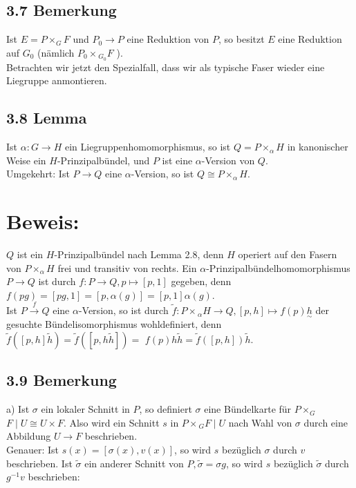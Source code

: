 \documentclass[10pt, letterpaper]{article}
\begin{document}
\subsection*{3.7 Bemerkung}
Ist $E=P \times_{G} F$ und $P_{0} \rightarrow P$ eine Reduktion von $P$, so besitzt $E$ eine Reduktion auf $G_{0}$ (nämlich $P_{0} \times{ }_{G_{0}} F$ ).\\
Betrachten wir jetzt den Spezialfall, dass wir als typische Faser wieder eine Liegruppe anmontieren.

\subsection*{3.8 Lemma}
Ist $\alpha: G \rightarrow H$ ein Liegruppenhomomorphismus, so ist $Q=P \times_{\alpha} H$ in kanonischer Weise ein $H$-Prinzipalbündel, und $P$ ist eine $\alpha$-Version von $Q$.\\
Umgekehrt: Ist $P \rightarrow Q$ eine $\alpha$-Version, so ist $Q \cong P \times_{\alpha} H$.

\section*{Beweis:}
$Q$ ist ein $H$-Prinzipalbündel nach Lemma 2.8, denn $H$ operiert auf den Fasern von $P \times_{\alpha} H$ frei und transitiv von rechts. Ein $\alpha$-Prinzipalbündelhomomorphismus $P \rightarrow Q$ ist durch $f: P \rightarrow Q, p \mapsto[p, 1]$ gegeben, denn $f(p g)=[p g, 1]=[p, \alpha(g)]=[p, 1] \alpha(g)$.\\
Ist $P \xrightarrow{f} Q$ eine $\alpha$-Version, so ist durch $\tilde{f}: P \times{ }_{\alpha} H \rightarrow Q,[p, h] \mapsto f(p) \underset{\sim}{h}$ der gesuchte Bündelisomorphismus wohldefiniert, denn $\tilde{f}([p, h] \tilde{h})=\tilde{f}([p, h \tilde{h}])=$ $f(p) h \tilde{h}=\tilde{f}([p, h]) \tilde{h}$.

\subsection*{3.9 Bemerkung}
a) Ist $\sigma$ ein lokaler Schnitt in $P$, so definiert $\sigma$ eine Bündelkarte für $P \times_{G}$ $F \mid U \cong U \times F$. Also wird ein Schnitt $s$ in $P \times{ }_{G} F \mid U$ nach Wahl von $\sigma$ durch eine Abbildung $U \rightarrow F$ beschrieben.\\
Genauer: Ist $s(x)=[\sigma(x), v(x)]$, so wird $s$ bezüglich $\sigma$ durch $v$ beschrieben. Ist $\tilde{\sigma}$ ein anderer Schnitt von $P, \tilde{\sigma}=\sigma g$, so wird $s$ bezüglich $\tilde{\sigma}$ durch $g^{-1} v$ beschrieben:
\end{document}
